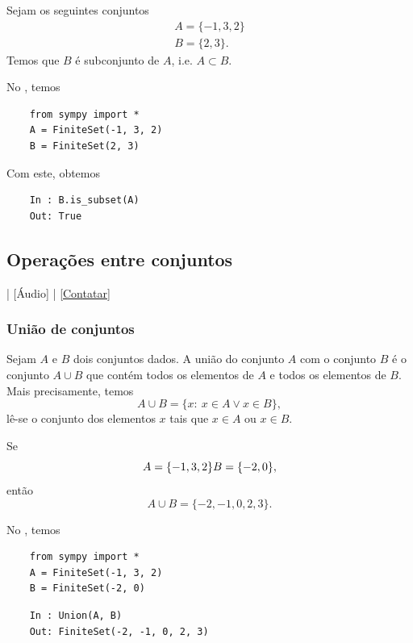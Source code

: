 \begin{ex}
  Sejam os seguintes conjuntos
  \begin{gather}
    A = \{-1, 3, 2\}\\
    B = \{2, 3\}.
  \end{gather}
  Temos que $B$ é subconjunto de $A$, i.e. $A\subset B$.
    
  \ifispython
  No \python, temos
  \begin{lstlisting}
    from sympy import *
    A = FiniteSet(-1, 3, 2)
    B = FiniteSet(2, 3)
  \end{lstlisting}
  Com este, obtemos
  \begin{lstlisting}
    In : B.is_subset(A)
    Out: True
  \end{lstlisting}
  \fi
\end{ex}

\subsection{Operações entre conjuntos}

\begin{flushright}
  [Vídeo] | [Áudio] | \href{https://phkonzen.github.io/notas/contato.html}{[Contatar]}
\end{flushright}

\subsubsection{União de conjuntos}

Sejam $A$ e $B$ dois conjuntos dados. A união do conjunto $A$ com o conjunto $B$ é o conjunto $A\cup B$ que contém todos os elementos de $A$ e todos os elementos de $B$. Mais precisamente, temos
\begin{equation}
  A\cup B = \{x:~x\in A \lor x\in B\},
\end{equation}
lê-se o conjunto dos elementos $x$ tais que $x\in A$ ou $x\in B$.

\begin{ex}
  Se
  \begin{equation}
    A = \{-1, 3, 2\}\\
    B = \{-2, 0\},
  \end{equation}
  então
  \begin{equation}
    A\cup B = \{-2, -1, 0, 2, 3\}.
  \end{equation}

  \ifispython
  No \python, temos
  \begin{lstlisting}
    from sympy import *
    A = FiniteSet(-1, 3, 2)
    B = FiniteSet(-2, 0)
  \end{lstlisting}
  \begin{lstlisting}
    In : Union(A, B)
    Out: FiniteSet(-2, -1, 0, 2, 3)
  \end{lstlisting}
  \fi
\end{ex}

